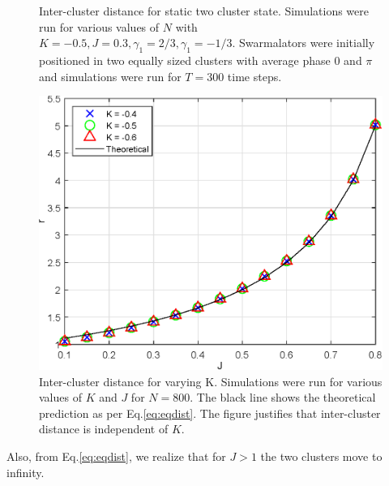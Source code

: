 \documentclass[superscriptaddress,reprint,amssymb, amsmath,aps, pre]{revtex4-1}
\begin{document}
{{\begin{figure}[h!]
            \caption{Inter-cluster distance for static two cluster state. Simulations were run for various values of \(N\) with \(K = -0.5,J = 0.3,\gamma_1 = 2/3,\gamma_1 = -1/3\). Swarmalators were initially positioned in two equally sized clusters with average phase \(0\) and \(\pi\) and simulations were run for \(T = 300\) time steps.}
            \label{fig:dvn}
        \end{figure}
        \begin{figure}[h!]
            \includegraphics[width = \linewidth]{interClusterNotLog.eps}
            \caption{Inter-cluster distance for varying K. Simulations were run for various values of \(K\) and \(J\) for \(N = 800\). The black line shows the theoretical prediction as per Eq.\ref{eq:eqdist}. The figure justifies that inter-cluster distance is independent of \(K\).}
            \label{fig:KvJ}
        \end{figure}
        Also, from Eq.\ref*{eq:eqdist}, we realize that for \(J > 1\) the two clusters move to infinity. 
    }
}
\end{document}
